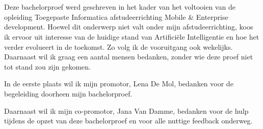 
\chapter*{}%
\label{ch:voorwoord}


Deze bachelorproef werd geschreven in het kader van het voltooien van de opleiding Toegepaste Informatica afstudeerrichting Mobile \& Enterprise development. Hoewel dit onderwerp niet valt onder mijn afstudeerrichting, koos ik ervoor uit interesse van de huidige stand van Artificiële Intelligentie en hoe het verder evolueert in de toekomst. Zo volg ik de vooruitgang ook wekelijks. Daarnaast wil ik graag een aantal mensen bedanken, zonder wie deze proef niet tot stand zou zijn gekomen.

In de eerste plaats wil ik mijn promotor, Lena De Mol, bedanken voor de begeleiding doorheen mijn bachelorproef.

Daarnaast wil ik mijn co-promotor, Jana Van Damme, bedanken voor de hulp tijdens de opzet van deze bachelorproef en voor alle nuttige feedback onderweg.
